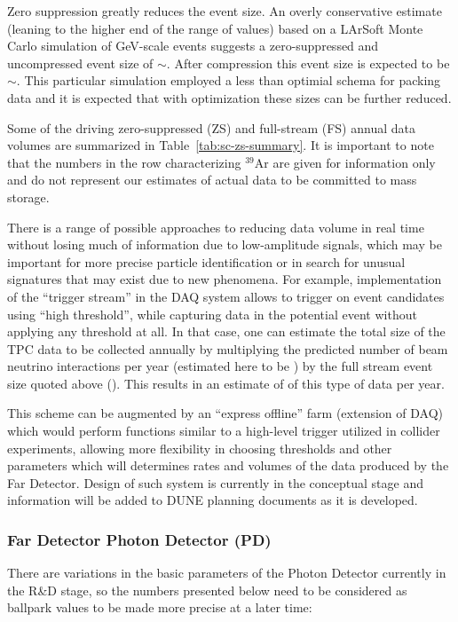 Zero suppression greatly reduces the event size.  An overly conservative estimate
(leaning to the higher end of the range of values)
 based on a LArSoft Monte Carlo simulation of GeV-scale
events suggests a zero-suppressed and uncompressed event size of $\sim$\beameventsize.
After compression this event size is expected to be $\sim$\beameventsizecompressed.
This particular
simulation employed a less than optimial schema for packing data and it is expected that
with optimization these sizes can be further reduced.


Some of the driving zero-suppressed (ZS) and full-stream (FS) annual
data volumes are summarized in Table~\ref{tab:sc-zs-summary}. It is important to note
that the numbers in the row characterizing $^{39}$Ar are given for information only and do
not represent our estimates of actual data to be committed to mass storage.

There is a range of possible approaches to reducing data volume in
real time without losing much of information due to low-amplitude
signals, which may be important for more precise particle
identification or in search for unusual signatures that may exist due
to new phenomena. For example, implementation of the ``trigger
stream'' in the DAQ system allows to trigger on event candidates using
``high threshold'', while capturing data in the potential event
without applying any threshold at all. In that case, one can estimate
the total size of the TPC data to be collected annually by multiplying
the predicted number of beam neutrino interactions per year (estimated
here to be \beamrate) by the full stream event size quoted above
(\dunefsreadoutsize).  This results in an estimate of
\beamdatayearfs of this type of data per year.

This scheme can be augmented by an ``express offline'' farm (extension of DAQ) which would perform functions similar to a high-level trigger
utilized in collider experiments, allowing more flexibility in choosing thresholds and other parameters which
will determines rates and volumes of the data produced by the Far Detector. Design of such system is currently
in the conceptual stage and information will be added to DUNE planning documents as it is developed.




\subsubsection{Far Detector Photon Detector (PD)}
There are variations in the basic parameters of the Photon Detector currently in the R\&D stage,
so the numbers presented below need to be considered as ballpark values to be made more precise
at a later time:

